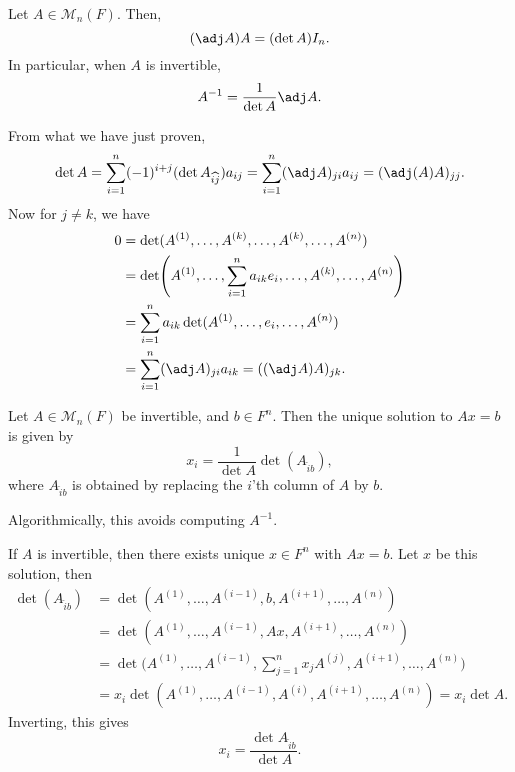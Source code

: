 \documentclass[12pt]{article}
\begin{document}
\begin{theorem}
	Let $A \in \mathcal{M}_n(F)$. Then,
	\[
		(\adj A) A = (\det A)I_n
	.\]
	In particular, when $A$ is invertible,
	\[
	A^{-1} = \frac{1}{\det A} \adj A
	.\]
\end{theorem}

\begin{proofbox}
	From what we have just proven,
	\[
		\det A = \sum_{i = 1}^{n} (-1)^{i+j}(\det A_{\widehat{ij}})a_{ij} = \sum_{i = 1}^{n}(\adj A)_{ji} a_{ij} = (\adj (A) A)_{jj}
	.\]
	Now for $j \neq k$, we have
	\begin{align*}
		0 &= \det(A^{(1)}, \ldots, A^{(k)}, \ldots, A^{(k)}, \ldots, A^{(n)}) \\
		  &= \det\Biggl(A^{(1)}, \ldots, \sum_{i = 1}^{n}a_{ik} e_i, \ldots, A^{(k)}, \ldots, A^{(n)} \Biggr) \\
		  &= \sum_{i = 1}^{n} a_{ik} \det (A^{(1)}, \ldots, e_i, \ldots, A^{(n)}) \\
		  &= \sum_{i = 1}^{n} (\adj A)_{ji} a_{ik} = ((\adj A)A)_{jk}.
	\end{align*}
\end{proofbox}

\begin{proposition}
	Let $A \in \mathcal{M}_n(F)$ be invertible, and $b \in F^{n}$. Then the unique solution to $Ax = b$ is given by
	\[
		x_i = \frac{1}{\det A} \det(A_{\hat i b})
	,\]
	where $A_{\hat i b}$ is obtained by replacing the $i$'th column of $A$ by $b$.
\end{proposition}

Algorithmically, this avoids computing $A^{-1}$.

\begin{proofbox}
	If $A$ is invertible, then there exists unique $x \in F^{n}$ with $Ax = b$. Let $x$ be this solution, then
	\begin{align*}
		\det(A_{\hat i b}) &= \det(A^{(1)}, \ldots, A^{(i-1)}, b, A^{(i+1)}, \ldots, A^{(n)}) \\
				   &= \det (A^{(1)}, \ldots, A^{(i-1)}, Ax, A^{(i+1)}, \ldots, A^{(n)}) \\
				   &= \det \Biggl(A^{(1)}, \ldots, A^{(i-1)}, \sum_{j = 1}^{n} x_j A^{(j)}, A^{(i+1)}, \ldots, A^{(n)} \Biggr) \\
				   &= x_i \det (A^{(1)}, \ldots, A^{(i-1)}, A^{(i)}, A^{(i+1)}, \ldots, A^{(n)}) = x_i \det A.
	\end{align*}
	Inverting, this gives
	\[
	x_i = \frac{\det A_{\hat i b}}{\det A}
	.\]
\end{proofbox}
\end{document}
